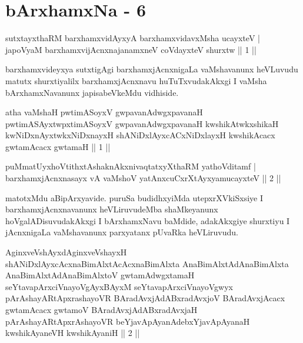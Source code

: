 \chapter{bArxhamxNa - 6}

\begin{shl}
sutxtayxthaRM barxhamxvidAyxyA barxhamxvidavxMsha ucayxteV |\\
japoV\s yaM barxhamxvijAcnxnajanamxneV coVdayxteV shurxtw \hfill || 1 ||
\end{shl}

\begin{artha}
barxhamxvideyxya sutxtigAgi barxhamxjAcnxnigaLa vaMshavanunx heVLuvudu matutx shurxtiyalilx barxhamxjAcnxnavu huTuTxvudakAkxgi I vaMsha bArxhamxNavanunx japisabeVkeMdu vidhiside.
\end{artha}


\begin{kandikeshl}
atha vaMshaH pwtimASoyxV gwpavanAdwgxpavanaH pwtimASAyxtwpxtimASoyxV gwpavanAdwgxpavanaH kwshikAtwkxshikaH kwNiDxnAyxtwkxNiDxnayxH shANiDxlAyxcACxNiDxlayxH kwshikAcacx gwtamAcacx gwtamaH || 1 ||
\end{kandikeshl}

\begin{shl}
puMmatUyxhoVtithxtAshaknAkxnivaqtatxyXthaRM yathoVditamf |\\
barxhamxjAcnxnasayx vA vaMshoV yatAnxcuCxrXtAyx\s yamucayxteV \hfill || 2 ||
\end{shl}

\begin{artha}
matotxMdu aBipArxyavide. puruSa budidhxyiMda utepxrXVkiSxsiye I barxhamxjAcnxnavanunx heVLiruvudeMba shaMkeyanunx hoVgalADisuvudakAkxgi I bArxhamxNavu baMdide, adakAkxgiye shurxtiyu I jAcnxnigaLa vaMshavanunx parxyatanx pUvaRka heVLiruvudu.
\end{artha}


\begin{kandikeshl}
AginxveVshAyxdAginxveVshayxH shANiDxlAyxcAcxnaBimAlxtAcAcxnaBimAlxta AnaBimAlxtAdAnaBimAlxta AnaBimAlxtAdAnaBimAlxtoV gwtamAdwgxtamaH seYtavapArxciVnayoVgAyxBAyxM seYtavapArxciVnayoVgwyx pArAshayARtApxrashayoVR BAradAvxjAdABxradAvxjoV BAradAvxjAcacx gwtamAcacx gwtamoV BAradAvxjAdABxradAvxjaH pArAshayARtApxrAshayoVR beYjavApAyanAdebxYjavApAyanaH kwshikAyaneVH kwshikAyaniH || 2 ||
\end{kandikeshl}

